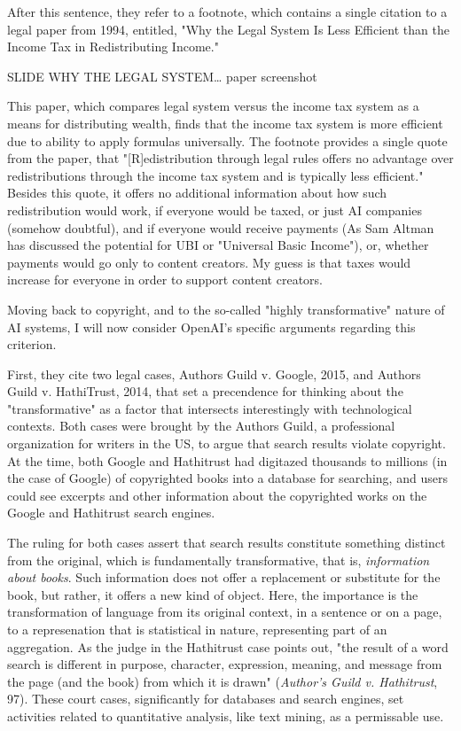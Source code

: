 \documentclass[11pt]{article}
\begin{document}
After this sentence, they refer to a footnote, which contains a single
citation to a legal paper from 1994, entitled, "Why the Legal System
Is Less Efficient than the Income Tax in Redistributing Income."

SLIDE WHY THE LEGAL SYSTEM\ldots{} paper screenshot

This paper, which compares legal system versus the income tax system
as a means for distributing wealth, finds that the income tax system
is more efficient due to ability to apply formulas universally. The
footnote provides a single quote from the paper, that
"[R]edistribution through legal rules offers no advantage over
redistributions through the income tax system and is typically less
efficient." Besides this quote, it offers no additional information
about how such redistribution would work, if everyone would be taxed,
or just AI companies (somehow doubtful), and if everyone would receive
payments (As Sam Altman has discussed the potential for UBI or
"Universal Basic Income"), or, whether payments would go only to
content creators. My guess is that taxes would increase for everyone
in order to support content creators.

Moving back to copyright, and to the so-called "highly transformative"
nature of AI systems, I will now consider OpenAI's specific arguments
regarding this criterion.

First, they cite two legal cases, Authors Guild v. Google, 2015, and
Authors Guild v. HathiTrust, 2014, that set a precendence for thinking
about the "transformative" as a factor that intersects interestingly
with technological contexts. Both cases were brought by the Authors
Guild, a professional organization for writers in the US, to argue
that search results violate copyright. At the time, both Google and
Hathitrust had digitazed thousands to millions (in the case of Google)
of copyrighted books into a database for searching, and users could
see excerpts and other information about the copyrighted works on the
Google and Hathitrust search engines.

The ruling for both cases assert that search results constitute
something distinct from the original, which is fundamentally
transformative, that is, \emph{information about books}. Such information
does not offer a replacement or substitute for the book, but rather,
it offers a new kind of object. Here, the importance is the
transformation of language from its original context, in a sentence or
on a page, to a represenation that is statistical in nature,
representing part of an aggregation. As the judge in the Hathitrust
case points out, "the result of a word search is different in purpose,
character, expression, meaning, and message from the page (and the
book) from which it is drawn" (\emph{Author's Guild v. Hathitrust}, 97).
These court cases, significantly for databases and search engines, set
activities related to quantitative analysis, like text mining, as a
permissable use.
\end{document}
